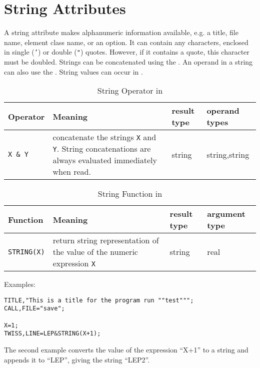 \section{String Attributes}
\label{sec:astring}
A string attribute makes alphanumeric information available,
e.g. a title, file name, element class name, or an option.
It can contain any characters, enclosed in single (\texttt{'})
or double (\texttt{"}) quotes.
However, if it contains a quote, this character must be doubled.
Strings can be concatenated using the 
. 
An operand in a string can also use the 
. 
String values can occur in .

\begin{table}[ht]
  \caption{String Operator in \opal}
  \label{tab:stroperator}
  \begin{center}
    \begin{tabular}{|l|p{}|l|l|}
      \hline
      Operator & Meaning & result type & operand types \\
      \hline
      \texttt{X \& Y} & concatenate the strings \texttt{X} and \texttt{Y}.
      String concatenations are always evaluated immediately when read. &
      string &string,string \\
      \hline
    \end{tabular}
  \end{center}
\end{table}

\begin{table}[ht]
  \caption{String Function in \opal}
  \label{tab:stringfun}
  \begin{center}
    \begin{tabular}{|l|p{}|l|l|}
      \hline
      Function & Meaning & result type & argument type \\
      \hline
      \texttt{STRING(X)} &
      return string representation of the value
      of the numeric expression \texttt{X} &
      string &real \\
      \hline
    \end{tabular}
  \end{center}
\end{table}
\par
\noindent Examples:
\begin{verbatim}
TITLE,"This is a title for the program run ""test""";
CALL,FILE="save";

X=1;
TWISS,LINE=LEP&STRING(X+1);
\end{verbatim}
The second example converts the value of the expression ``X+1'' to a
string and appends it to ``LEP'', giving the string ``LEP2''.

